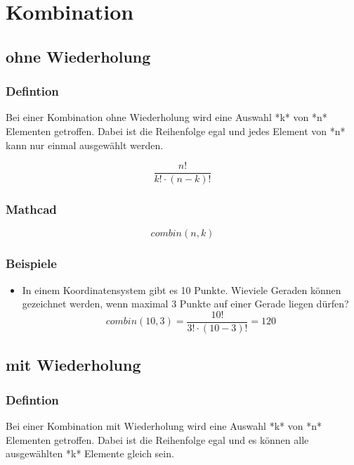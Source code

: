 \documentclass[a4paper,10pt]{article}
\begin{document}
\section{Kombination}
\subsection{ohne Wiederholung}
\subsubsection{Defintion}
Bei einer Kombination ohne Wiederholung wird eine Auswahl *k* von *n*
Elementen getroffen. Dabei ist die Reihenfolge egal und jedes Element
von *n* kann nur einmal ausgewählt werden.

\begin{equation}
  \frac{n!}{k! \cdot (n - k)!}
\end{equation}

\subsubsection{Mathcad}
\begin{equation}
  \label{eq:14}
  combin(n, k)
\end{equation}

\subsubsection{Beispiele}
\begin{itemize}
\item {
    In einem Koordinatensystem gibt es 10 Punkte. Wieviele Geraden
    können gezeichnet werden, wenn maximal 3 Punkte auf einer Gerade
    liegen dürfen?
    \begin{equation}
      \label{eq:13}
      combin(10, 3) = \frac{10!}{3! \cdot (10 - 3)!} = 120
    \end{equation}
  }
\end{itemize}

\subsection{mit Wiederholung}
\subsubsection{Defintion}
Bei einer Kombination mit Wiederholung wird eine Auswahl *k* von *n*
Elementen getroffen. Dabei ist die Reihenfolge egal und es können alle
ausgewählten *k* Elemente gleich sein.
\end{document}
